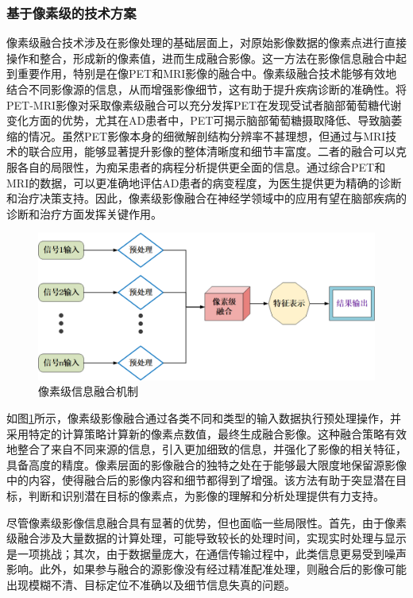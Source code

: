 \subsubsection{基于像素级的技术方案}
像素级融合技术涉及在影像处理的基础层面上，对原始影像数据的像素点进行直接操作和整合，形成新的像素值，进而生成融合影像。这一方法在影像信息融合中起到重要作用，特别是在像PET和MRI影像的融合中。像素级融合技术能够有效地结合不同影像源的信息，从而增强影像细节，这有助于提升疾病诊断的准确性。将PET-MRI影像对采取像素级融合可以充分发挥PET在发现受试者脑部葡萄糖代谢变化方面的优势，尤其在AD患者中，PET可揭示脑部葡萄糖摄取降低、导致脑萎缩的情况。虽然PET影像本身的细微解剖结构分辨率不甚理想，但通过与MRI技术的联合应用，能够显著提升影像的整体清晰度和细节丰富度。二者的融合可以克服各自的局限性，为痴呆患者的病程分析提供更全面的信息。通过综合PET和MRI的数据，可以更准确地评估AD患者的病变程度，为医生提供更为精确的诊断和治疗决策支持。因此，像素级影像融合在神经学领域中的应用有望在脑部疾病的诊断和治疗方面发挥关键作用。

   \begin{figure}[htbp]
      \centering  
      \includegraphics[width=0.9\linewidth]{figs/pixelFusion.png}
      \caption{像素级信息融合机制}\label{pixelFusion}
    \end{figure}
    
如图\ref{pixelFusion}所示，像素级影像融合通过各类不同和类型的输入数据执行预处理操作，并采用特定的计算策略计算新的像素点数值，最终生成融合影像。这种融合策略有效地整合了来自不同来源的信息，引入更加细致的信息，并强化了影像的相关特征，具备高度的精度。像素层面的影像融合的独特之处在于能够最大限度地保留源影像中的内容，使得融合后的影像内容和细节都得到了增强。该方法有助于突显潜在目标，判断和识别潜在目标的像素点，为影像的理解和分析处理提供有力支持。

尽管像素级影像信息融合具有显著的优势，但也面临一些局限性。首先，由于像素级融合涉及大量数据的计算处理，可能导致较长的处理时间，实现实时处理与显示是一项挑战；其次，由于数据量庞大，在通信传输过程中，此类信息更易受到噪声影响。此外，如果参与融合的源影像没有经过精准配准处理，则融合后的影像可能出现模糊不清、目标定位不准确以及细节信息失真的问题。

